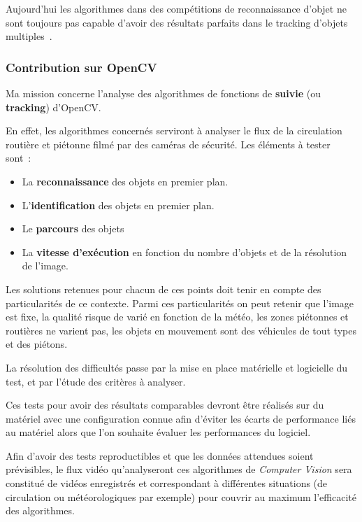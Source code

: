 Aujourd'hui les algorithmes dans des compétitions de reconnaissance d'objet ne sont toujours pas capable d'avoir des résultats parfaits dans le tracking d'objets multiples~\cite{MOT16}.

  \subsubsection{Contribution sur OpenCV}
      Ma mission concerne l'analyse des algorithmes de fonctions de \textbf{suivie} (ou \textbf{tracking}) d'OpenCV.
     
     En effet, les algorithmes concernés serviront à analyser le flux de la circulation routière et piétonne filmé par des caméras de sécurité. Les éléments à tester sont~:
     \begin{itemize}
\item La \textbf{reconnaissance} des objets en premier plan.
\item L’\textbf{identification} des objets en premier plan.
\item Le \textbf{parcours} des objets
\item La \textbf{vitesse d’exécution} en fonction du nombre d’objets et de la résolution de l’image.
\end{itemize}
  
    Les solutions retenues pour chacun de ces points doit tenir en compte des particularités de ce contexte. Parmi ces particularités on peut retenir que l'image est fixe, la qualité risque de varié en fonction de la météo, les zones piétonnes et routières ne varient pas, les objets en mouvement sont des véhicules de tout types et des piétons.
    
    
    La résolution des difficultés passe par la mise en place matérielle et logicielle du test, et par l'étude des critères à analyser.
    
  Ces tests pour avoir des résultats comparables devront être réalisés sur du matériel avec une configuration connue afin d'éviter les écarts de performance liés au matériel alors que l'on souhaite évaluer les performances du logiciel.
        
  Afin d'avoir des tests reproductibles et que les données attendues soient prévisibles, le flux vidéo qu'analyseront ces algorithmes de \textit{Computer Vision} sera constitué de vidéos enregistrés et correspondant à différentes situations (de circulation ou météorologiques par exemple) pour couvrir au maximum l'efficacité des algorithmes.

